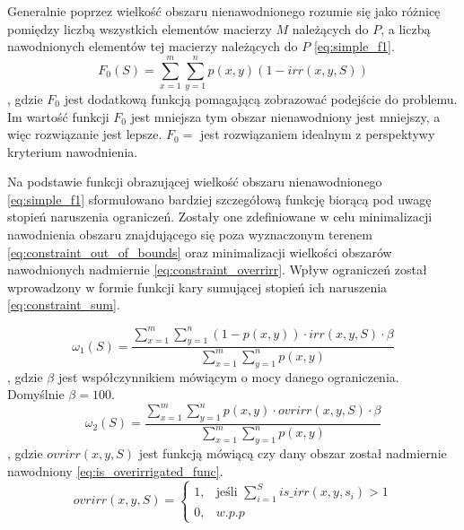 \documentclass[twoside]{iisthesis}
\begin{document}
Generalnie poprzez wielkość obszaru nienawodnionego rozumie się jako różnicę pomiędzy liczbą wszystkich elementów macierzy $M$ należących do $P$, a liczbą nawodnionych elementów tej macierzy należących do $P$ \eqref{eq:simple_f1}.
\begin{equation}\label{eq:simple_f1}
	F_{0}(S) = \sum_{x=1}^{m}\sum_{y=1}^{n} p(x,y)(1 - irr(x,y,S))
\end{equation}
, gdzie $F_{0}$ jest dodatkową funkcją pomagającą zobrazować podejście do problemu. Im wartość funkcji $F_{0}$ jest mniejsza tym obszar nienawodniony jest mniejszy, a więc rozwiązanie jest lepsze. $F_{0} = $ jest rozwiązaniem idealnym z perspektywy kryterium nawodnienia.


Na podstawie funkcji obrazującej wielkość obszaru nienawodnionego \eqref{eq:simple_f1} sformułowano bardziej szczegółową funkcję biorącą pod uwagę stopień naruszenia ograniczeń. Zostały one zdefiniowane w celu minimalizacji nawodnienia obszaru znajdującego się poza wyznaczonym terenem \eqref{eq:constraint_out_of_bounds} oraz minimalizacji wielkości obszarów nawodnionych nadmiernie \eqref{eq:constraint_overrirr}. Wpływ ograniczeń został wprowadzony w formie funkcji kary sumującej stopień ich naruszenia \eqref{eq:constraint_sum}.

\begin{equation}\label{eq:constraint_out_of_bounds}
	\omega_{1}(S) = \dfrac{\sum_{x=1}^{m}\sum_{y=1}^{n} (1 - p(x,y)) \cdot irr(x,y,S) \cdot \beta}{\sum_{x=1}^{m}\sum_{y=1}^{n} p(x,y)}
\end{equation}
, gdzie $\beta$ jest współczynnikiem mówiącym o mocy danego ograniczenia. Domyślnie $\beta=100$.\\
\begin{equation}\label{eq:constraint_overrirr}
	\omega_{2}(S) = \dfrac{\sum_{x=1}^{m}\sum_{y=1}^{n} p(x,y) \cdot ovrirr(x,y,S) \cdot \beta}{\sum_{x=1}^{m}\sum_{y=1}^{n} p(x,y)}
\end{equation}
, gdzie $ovrirr(x,y,S)$ jest funkcją mówiącą czy dany obszar został nadmiernie nawodniony \eqref{eq:is_overirrigated_func}.\\
\begin{equation}\label{eq:is_overirrigated_func}
	ovrirr(x,y,S) = \begin{cases}
				1,& \text{jeśli } \sum_{i=1}^{S} is\_irr(x,y,s_{i}) > 1 \\
				0,& w.p.p
			   \end{cases}
\end{equation}
\end{document}
